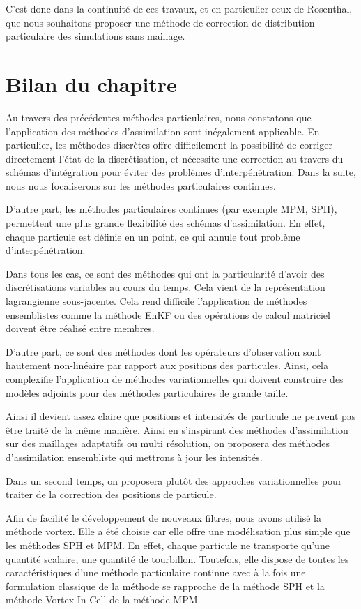 C'est donc dans la continuité de ces travaux, et en particulier ceux de Rosenthal, que nous souhaitons proposer une méthode de correction de distribution particulaire des simulations sans maillage.

\section{Bilan du chapitre}

Au travers des précédentes méthodes particulaires, nous constatons que l'application des méthodes d'assimilation sont inégalement applicable. En particulier, les méthodes discrètes offre difficilement la possibilité de corriger directement l'état de la discrétisation, et nécessite une correction au travers du schémas d'intégration pour éviter des problèmes d'interpénétration. Dans la suite, nous nous focaliserons sur les méthodes particulaires continues.

D'autre part, les méthodes particulaires continues (par exemple MPM, SPH), permettent une plus grande flexibilité des schémas d'assimilation. En effet, chaque particule est définie en un point, ce qui annule tout problème d'interpénétration.

Dans tous les cas, ce sont des méthodes qui ont la particularité d'avoir des discrétisations variables au cours du temps. Cela vient de la représentation lagrangienne sous-jacente. Cela rend difficile l'application de méthodes ensemblistes comme la méthode EnKF ou des opérations de calcul matriciel doivent être réalisé entre membres.

D'autre part, ce sont des méthodes dont les opérateurs d'observation sont hautement non-linéaire par rapport aux positions des particules. Ainsi, cela complexifie l'application de méthodes variationnelles qui doivent construire des modèles adjoints pour des méthodes particulaires de grande taille.

Ainsi il devient assez claire que positions et intensités de particule ne peuvent pas être traité de la même manière. Ainsi en s'inspirant des méthodes d'assimilation sur des maillages adaptatifs ou multi résolution, on proposera des méthodes d'assimilation ensembliste qui mettrons à jour les intensités.

Dans un second temps, on proposera plutôt des approches variationnelles pour traiter de la correction des positions de particule.

Afin de facilité le développement de nouveaux filtres, nous avons utilisé la méthode vortex. Elle a été choisie car elle offre une modélisation plus simple que les méthodes SPH et MPM. En effet, chaque particule ne transporte qu'une quantité scalaire, une quantité de tourbillon. Toutefois, elle dispose de toutes les caractéristiques d'une méthode particulaire continue avec à la fois une formulation classique de la méthode se rapproche de la méthode SPH et la méthode Vortex-In-Cell de la méthode MPM.
